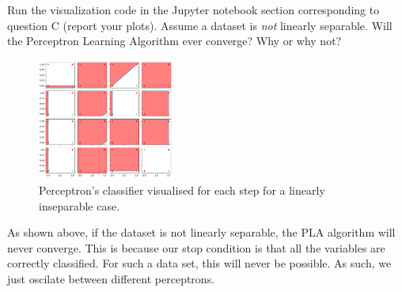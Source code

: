 \begin{problem}[2]
  Run the visualization code in the Jupyter notebook section corresponding to question C (report your plots). Assume a dataset is \emph{not} linearly separable. Will the Perceptron Learning Algorithm ever converge? Why or why not?
\end{problem}
\begin{solution}
  \begin{figure}[H]
    \centering
    \includegraphics[width=0.4\textwidth]{unseparable_PLA.pdf}
    \caption{Perceptron's classifier visualised for each step for a linearly inseparable case.}
  \end{figure}

  As shown above, if the dataset is not linearly separable, the PLA algorithm will never converge. This is because our stop condition is that all the variables are correctly classified. For such a data set, this will never be possible. As such, we just oscilate between different perceptrons.
\end{solution}

